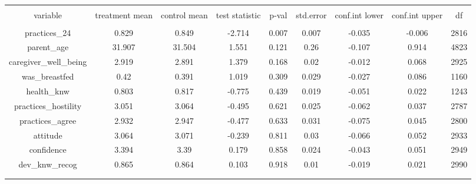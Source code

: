
\begin{table}[!htbp] \centering 
  \caption{} 
  \label{tbl:treatment_baseline_imbalance_serbia} 
\begin{tabular}{@{\extracolsep{5pt}} ccccccccc} 
\\[-1.8ex]\hline 
\hline \\[-1.8ex] 
variable & treatment mean & control mean & test statistic & p-val & std.error & conf.int lower & conf.int upper & df \\ 
\hline \\[-1.8ex] 
practices\_24 & 0.829 & 0.849 & -2.714 & 0.007 & 0.007 & -0.035 & -0.006 & 2816 \\ 
parent\_age & 31.907 & 31.504 & 1.551 & 0.121 & 0.26 & -0.107 & 0.914 & 4823 \\ 
caregiver\_well\_being & 2.919 & 2.891 & 1.379 & 0.168 & 0.02 & -0.012 & 0.068 & 2925 \\ 
was\_breastfed & 0.42 & 0.391 & 1.019 & 0.309 & 0.029 & -0.027 & 0.086 & 1160 \\ 
health\_knw & 0.803 & 0.817 & -0.775 & 0.439 & 0.019 & -0.051 & 0.022 & 1243 \\ 
practices\_hostility & 3.051 & 3.064 & -0.495 & 0.621 & 0.025 & -0.062 & 0.037 & 2787 \\ 
practices\_agree & 2.932 & 2.947 & -0.477 & 0.633 & 0.031 & -0.075 & 0.045 & 2800 \\ 
attitude & 3.064 & 3.071 & -0.239 & 0.811 & 0.03 & -0.066 & 0.052 & 2933 \\ 
confidence & 3.394 & 3.39 & 0.179 & 0.858 & 0.024 & -0.043 & 0.051 & 2949 \\ 
dev\_knw\_recog & 0.865 & 0.864 & 0.103 & 0.918 & 0.01 & -0.019 & 0.021 & 2990 \\ 
 &  &  &  &  &  &  &  &  \\ 
\hline \\[-1.8ex] 
\end{tabular} 
\end{table} 
